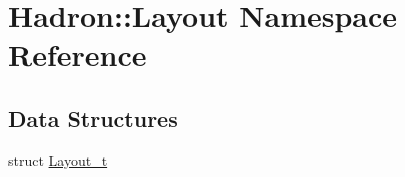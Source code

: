 \hypertarget{namespaceHadron_1_1Layout}{}\section{Hadron\+:\+:Layout Namespace Reference}
\label{namespaceHadron_1_1Layout}
\subsection*{Data Structures}
\begin{DoxyCompactItemize}
\item 
struct \mbox{\hyperlink{structHadron_1_1Layout_1_1Layout__t}{Layout\+\_\+t}}
\end{DoxyCompactItemize}
